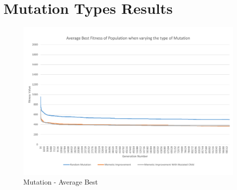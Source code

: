 
\section{Mutation Types Results} %
\label{sec:mutation_types_results}

\begin{landscape}
\begin{figure}[thbp]
	\centerline{\includegraphics[height=0.945\textwidth]{figures/CircleTests/Mutation/CircleTestMutationAverageBest.pdf}}
	\caption{Mutation - Average Best}
	\label{fig:ctmab}
\end{figure}
\end{landscape}

